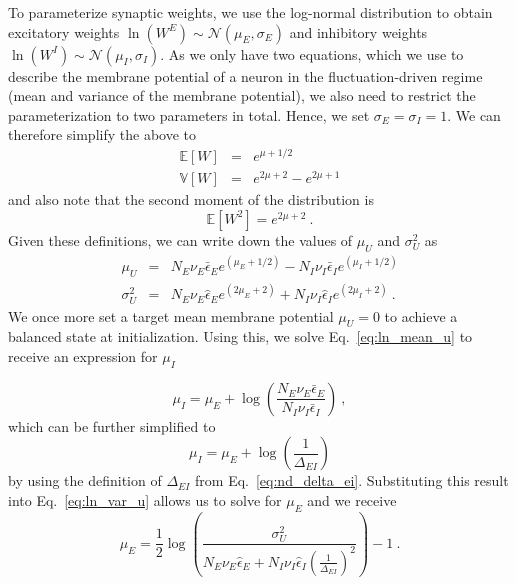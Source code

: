 \documentclass[11pt,a4paper]{article}
\begin{document}
\begin{refsection}
To parameterize synaptic weights, we use the log-normal distribution to obtain excitatory weights $\ln(W^E) \sim \mathcal{N}(\mu_E, \sigma_E)$ and inhibitory weights $\ln(W^I) \sim \mathcal{N}(\mu_I, \sigma_I)$. As we only have two equations, which we use to describe the membrane potential of a neuron in the fluctuation-driven regime (mean and variance of the membrane potential), we also need to restrict the parameterization to two parameters in total. Hence, we set $\sigma_E = \sigma_I = 1$. We can therefore simplify the above to
\begin{eqnarray}
    \mathbb{E}[W] &=& e^{\mu + 1/2} \\
    \mathbb{V}[W] &=& e^{2 \mu + 2} - e^{2\mu + 1}
\end{eqnarray}
and also note that the second moment of the distribution is
\begin{equation}
    \mathbb{E}[W^2] = e^{2 \mu + 2} ~.
\end{equation}
Given these definitions, we can write down the values of $\mu_U$ and $\sigma_U^2$ as
\begin{eqnarray}
    \mu_U &=& N_E\nu_E\bar\epsilon_Ee^{(\mu_E + 1/2)} - N_I\nu_I\bar\epsilon_Ie^{(\mu_I + 1/2)}
    \label{eq:ln_mean_u}\\
    \sigma^2_U &=& N_E\nu_E\hat\epsilon_E e^{(2\mu_E + 2)} + N_I\nu_I\hat\epsilon_I e^{(2\mu_I + 2)}  ~.
    \label{eq:ln_var_u}
\end{eqnarray}
We once more set a target mean membrane potential $\mu_U = 0$ to achieve a balanced state at initialization. Using this, we solve Eq.~\eqref{eq:ln_mean_u} to receive an expression for $\mu_I$

\begin{equation}
    \mu_I = \mu_E + \log \left(\frac{N_E\nu_E\bar\epsilon_E}{N_I\nu_I\bar\epsilon_I} \right)~ ,
\end{equation}
which can be further simplified to 
\begin{equation}
    \mu_I = \mu_E + \log \left(\frac{1}{\Delta_{EI}}\right)
    \label{eq:ln_nd_mu_i}
\end{equation}
by using the definition of $\Delta_{EI}$ from Eq.~\eqref{eq:nd_delta_ei}.
Substituting this result into Eq.~\eqref{eq:ln_var_u} allows us to solve for $\mu_E$ and we receive
\begin{equation}
    \mu_E = \frac{1}{2} \log\left(\frac{\sigma_U^2}{N_E \nu_E \hat\epsilon_E + N_I \nu_I \hat\epsilon_I \left(\frac{1}{\Delta_{EI}} \right)^2 } \right) - 1 ~.
    \label{eq:ln_nd_mu_e}
\end{equation}


\end{refsection}
\end{document}
